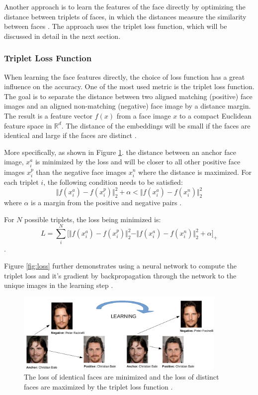 \documentclass[12pt,english]{article}
\begin{document}
Another approach is to learn the features of the face directly by optimizing the distance between triplets of faces, in which the distances measure the similarity between faces \cite{trigueros} \cite{schroff}. The approach uses the triplet loss function, which will be discussed in detail in the next section.

\subsubsection{Triplet Loss Function}
\quad
When learning the face features directly, the choice of loss function has a great influence on the accuracy. One of the most used metric is the triplet loss function. The goal is to separate the distance between two aligned matching (positive) face images and an aligned non-matching (negative) face image by a distance margin. The result is a feature vector $f(x)$ from a face image $x$ to a compact Euclidean feature space in $ \mathbb{R}^{d}$. The distance of the embeddings will be small if the faces are identical and large if the faces are distinct \cite{schroff}.


More specifically, as shown in Figure \ref{fig:bale}. the distance between an anchor face image, $x_{i}^{a}$ is minimized by the loss and will be closer to all other positive face images $x_{i}^{p}$ than the negative face images $x_{i}^{n}$ where the distance is maximized. For each triplet $i$, the following condition needs to be satisfied: $$\Vert f(x_{i}^{a}) - f(x_{i}^{p}) \Vert_{2}^{2} + \alpha < \Vert f(x_{i}^{a}) - f(x_{i}^{n}) \Vert_{2}^{2} $$
where $\alpha$ is a margin from the positive and negative pairs \cite{trigueros}.

For $N$ possible triplets, the loss being minimized is: $$ L = \sum_{i}^{N} \Big[ \Vert f(x_{i}^{a}) - f(x_{i}^{p}) \Vert_{2}^{2} - \Vert f(x_{i}^{a}) - f(x_{i}^{n}) \Vert_{2}^{2} + \alpha\Big]_{+} $$.

Figure \ref{fig:loss} further demonstrates using a neural network to compute the triplet loss and it's gradient by backpropagation through the network to the unique images in the learning step \cite{amos}.

\begin{figure}[!tbp]
 \centering
    \includegraphics[width=0.9\textwidth]{figures/triplet_loss_example.png}
    \caption{The loss of identical faces are minimized and the loss of distinct faces are maximized by the triplet loss function \cite{pic1} \cite{pic2}.}
	\label{fig:bale}
\end{figure}
\end{document}
